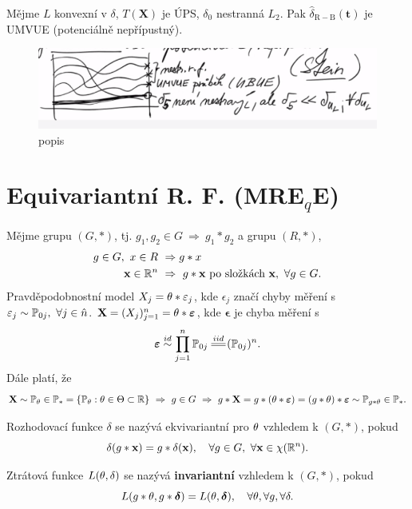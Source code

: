 \begin{theorem}
	Mějme $L$ konvexní v $\delta$, $T(\textbf{X})$ je ÚPS, $\delta_0$ nestranná $L_2$. Pak $\widehat{\delta}_\mathrm{R-B}(\textbf{t})$ je UMVUE (potenciálně nepřípustný).
	
	\begin{figure}[h]
		\centering
		\includegraphics[width=0.6\linewidth]{pictures/3.12-1}
		\caption{popis}
		\label{fig:3}
	\end{figure}
	
\end{theorem}

\section{Equivariantní R. F. (MRE$_q$E)}
\begin{define}
	Mějme grupu $(G,\ast)$, tj. $g_1,g_2\in G~\Rightarrow~ g_1\ast g_2$ a grupu $(R,\ast)$, \[
	\begin{split}
	g\in G,~x\in R&~\Rightarrow g\ast x \\ \textbf{x}\in\mathbb{R}^n&~\Rightarrow~ g\ast \textbf{x}\text{ po složkách }\textbf{x},~\forall g\in G.
	\end{split}
	\]
	Pravděpodobnostní model $X_j=\theta\ast \varepsilon_j$, kde $\epsilon_j$ značí chyby měření s $\varepsilon_j\sim \mathbb{P}_{0j},~\forall j\in\hat{n}$. $\textbf{X}=(X_j)_{j=1}^n=\theta\ast\boldsymbol{\varepsilon}$, kde $\boldsymbol{\epsilon}$ je chyba měření s $$\boldsymbol{\epsilon}\stackrel{id}{\sim}\prod_{j=1}^n \PP_{0j}\equal{iid}(\PP_{0j})^n.$$
	Dále platí, že $$ \textbf{X}\sim \mathbb{P}_\theta\in\mathbb{P}_\ast=\{\mathbb{P}_\theta:\theta\in\Theta\subset \mathbb{R}\}~\Rightarrow~ g\in G~\Rightarrow~ g\ast \textbf{X}=g\ast(\theta\ast\boldsymbol{\varepsilon})=(g\ast\theta)\ast\boldsymbol{\varepsilon}\sim \mathbb{P}_{g\ast \theta}\in \mathbb{P}_\ast.$$ 
\end{define}
\begin{theorem}
	Rozhodovací funkce $\delta$ se nazývá ekvivariantní pro $\theta$ vzhledem k $(G,\ast)$, pokud $$ \delta(g\ast\textbf{x})=g\ast \delta(\textbf{x}),\quad \forall g\in G,~\forall \textbf{x}\in\chi(\mathbb{R}^n).$$
\end{theorem}
\begin{theorem}
	Ztrátová funkce $L(\theta,\delta)$ se nazývá \textbf{invariantní} vzhledem k $(G,\ast)$, pokud $$ L(g\ast\theta,g\ast\boldsymbol{\delta})=L(\theta,\boldsymbol{\delta}),\quad\forall \theta,\forall g,\forall \delta.$$
\end{theorem}
